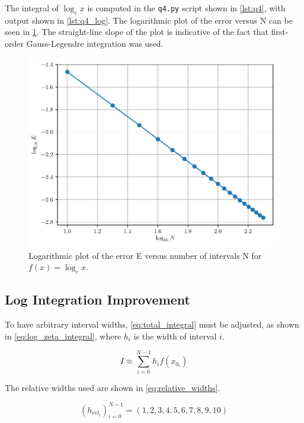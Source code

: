 \documentclass[a4paper,titlepage]{article}
\newcommand{\code}[1]{\texttt{#1}}
\begin{document}
	The integral of $\log_e x$ is computed in the \code{q4.py} script shown in \cref{lst:q4}, with output shown in \cref{lst:q4_log}. The logarithmic plot of the error versus N can be seen in \cref{fig:q4b}. The straight-line slope of the plot is indicative of the fact that first-order Gauss-Legendre integration was used.
	
	\begin{figure}[!htb]
		\centering
		\includegraphics[width=\columnwidth]{plots/q4b.pdf}
		\caption
		{Logarithmic plot of the error E versus number of intervals N for $f(x) = \log_e x$.}
		\label{fig:q4b}
	\end{figure}
	
	\subsection{Log Integration Improvement}
	
	To have arbitrary interval widths, \cref{eq:total_integral} must be adjusted, as shown in \cref{eq:log_zeta_integral}, where $h_i$ is the width of interval $i$.
	
	\begin{equation} \label{eq:log_zeta_integral}
		I \approx \sum_{i=0}^{N-1} h_i f(x_{0_i}) 
	\end{equation}
	
	The relative widths used are shown in \cref{eq:relative_widths}.
	
	\begin{equation} \label{eq:relative_widths}
		(h_{rel_i})_{i=0}^{N-1} = (1, 2, 3, 4, 5, 6, 7, 8, 9, 10)
	\end{equation}
	
\end{document}

